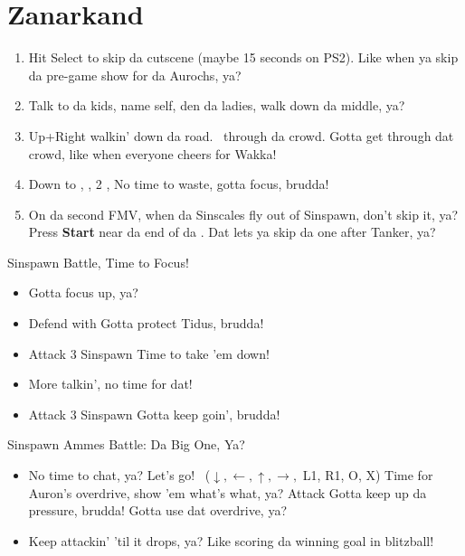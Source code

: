 \chapter{Zanarkand}

\begin{enumerate}
    \item Hit Select to skip da cutscene (maybe 15 seconds on PS2). Like when ya skip da pre-game show for da Aurochs, ya?
    \item Talk to da kids, name self, den da ladies, walk down da middle, ya?
    \item Up+Right walkin' down da road. \sd\ through da crowd. \skippablefmv[2:30] Gotta get through dat crowd, like when everyone cheers for Wakka!
    \item Down to \auron, \sd, 2 \skippablefmv[2:30], \sd No time to waste, gotta focus, brudda!
    \item On da second FMV, when da Sinscales fly out of Sinspawn, don't skip it, ya? Press \textbf{Start} near da end of da \fmv. Dat lets ya skip da one after Tanker, ya?
\end{enumerate}
\begin{battle}{Sinspawn Battle, Time to Focus!}
    \begin{itemize}
        \item \sd Gotta focus up, ya?
        \item Defend with \tidus Gotta protect Tidus, brudda!
        \item Attack 3 Sinspawn Time to take 'em down!
        \item \sd More talkin', no time for dat!
        \item Attack 3 Sinspawn Gotta keep goin', brudda!
    \end{itemize}
\end{battle}
\begin{battle}[2400]{Sinspawn Ammes Battle: Da Big One, Ya?}
    \begin{itemize}
        \item \sd No time to chat, ya? Let's go!
        \auronf \od\ ($\downarrow, \leftarrow, \uparrow, \rightarrow,$ L1, R1, O, X) Time for Auron's overdrive, show 'em what's what, ya?
        \tidusf Attack Gotta keep up da pressure, brudda!
        \tidusf \od Gotta use dat overdrive, ya?
        \item Keep attackin' 'til it drops, ya? Like scoring da winning goal in blitzball!
    \end{itemize}
\end{battle}

